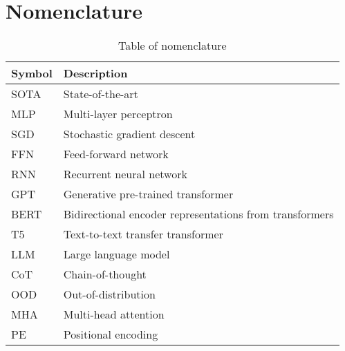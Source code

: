 \chapter{Nomenclature}\label{app:nomenclature}

\begin{table}[H]
    \centering
    \begin{tabular}{ll}
        \toprule
        \textbf{Symbol} & \textbf{Description}                                    \\
        \midrule
        SOTA            & State-of-the-art                                        \\
        MLP             & Multi-layer perceptron                                  \\
        SGD             & Stochastic gradient descent                             \\
        FFN             & Feed-forward network                                    \\
        RNN             & Recurrent neural network                                \\
        GPT             & Generative pre-trained transformer                      \\
        BERT            & Bidirectional encoder representations from transformers \\
        T5              & Text-to-text transfer transformer                       \\
        LLM             & Large language model                                    \\
        CoT             & Chain-of-thought                                        \\
        OOD             & Out-of-distribution                                     \\
        MHA             & Multi-head attention                                    \\
        PE              & Positional encoding                                     \\
        \bottomrule
    \end{tabular}
    \caption{Table of nomenclature}
    \label{tab:nomenclature}
\end{table}